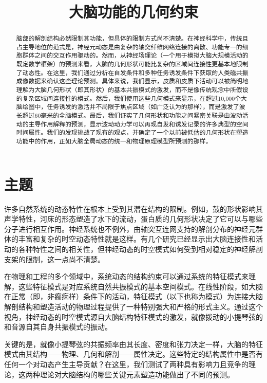 \documentclass[lang=cn,a4paper,newtx]{elegantpaper}
\title{大脑功能的几何约束}
\date{}
\begin{document}
\maketitle

\begin{abstract}
脑部的解剖结构必然限制其功能，但具体的限制方式尚不清楚。在神经科学中，传统且占主导地位的范式是，神经元动态是由复杂的轴突纤维网络连接的离散、功能专一的细胞群体之间的交互作用驱动的。然而，从神经场理论（一个用于模拟大脑大规模活动的既定数学框架）的预测来看，大脑的几何形状可能比复杂的区域间连接性更基本地限制了动态性。在这里，我们通过分析在自发条件和多种任务诱发条件下获取的人类磁共振成像数据来确认这些理论预测。具体来说，我们显示，皮质和皮质下活动可以被简明地理解为大脑几何形状（即其形状）的基本共振模式的激发，而不是像传统观念中所假设的复杂区域间连接性的模式。然后，我们使用这些几何模式来显示，在超过10,000个大脑绘图中，任务诱发的激活并不局限于焦点区域（如广泛认为的那样），而是激发了波长超过60毫米的全脑模式。最后，我们证实了几何形状和功能之间紧密关联是由波动活动的主导作用解释的预测，显示波动动力学可以再现自发和诱发记录的许多典型的空间时间属性。我们的发现挑战了现有的观点，并确定了一个以前被低估的几何形状在塑造功能中的作用，正如大脑全局动态的统一和物理原理模型所预测的那样。
\end{abstract}

\section{主题}

许多自然系统的动态特性在根本上受到其潜在结构的限制。例如，鼓的形状影响其声学特性，河床的形态塑造了水下的流动，蛋白质的几何形状决定了它可以与哪些分子进行相互作用。神经系统也不例外，由轴突互连网支持的解剖分布的神经元群体的丰富和复杂的时空动态特性就是这样。有几个研究已经显示出大脑连接性和活动的各种特性之间的相关性，但神经动态的时空模式如何受到相对稳定的神经解剖支架的限制，这一点尚不清楚。

在物理和工程的多个领域中，系统动态的结构约束可以通过系统的特征模式来理解，这些特征模式是对应系统自然共振模式的基本空间模式。在线性阶段，如大脑在正常（即，非癫痫样）条件下的活动，特征模式（以下也称为模式）为连接大脑解剖结构和塑造活动的物理过程提供了一种特别强大和严格的形式主义。通过这个视角，神经动态的时空模式源自大脑结构特征模式的激发，就像拨动的小提琴弦的和音源自其自身共振模式的振动。

关键的是，就像小提琴弦的共振频率由其长度、密度和张力决定一样，大脑的特征模式由其结构——物理、几何和解剖——属性决定。这些特定的结构属性中是否有任何一个对动态产生主导贡献？在这里，我们测试了两种具有影响力且竞争的理论，这两种理论对大脑结构的哪些关键元素塑造功能做出了不同的预测。
\end{document}
